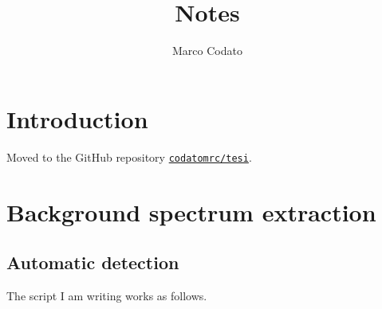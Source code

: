 \documentclass{article}
\author{Marco Codato}
\title{Notes}
\begin{document}
\maketitle

\section{Introduction}

Moved to the GitHub repository  \href{https://github.com/codatomrc/tesi}{\texttt{codatomrc/tesi}}.

\section{Background spectrum extraction}

\subsection{Automatic detection}
The script I am writing works as follows.
\end{document}
